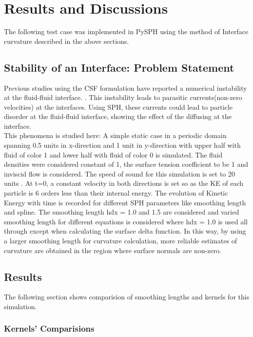 \chapter{Results and Discussions}
The following test case was implemented in PySPH using the method of Interface curvature described in the above sections. \\


\section{Stability of an Interface: Problem Statement}

Previous studies using the CSF formulation have reported a numerical instability at the fluid-fluid interface. \citep{rudman, Surface}. This instability leads to parasitic currents(non-zero velocities) at the interfaces. Using SPH, these currents could lead to particle disorder at the fluid-fluid interface, showing the effect of the diffusing at the interface. \\

This phenomena is studied here: A simple static case in a periodic domain spanning 0.5 units in x-direction and 1 unit in y-direction with upper half with fluid of color 1 and lower half with fluid of color 0 is simulated. The fluid densities were considered constant of 1, the surface tension coefficient to be 1 and inviscid flow is considered. The speed of sound for this simulation is set to 20 units \citep{Morris}. At t=0, a constant velocity in both directions is set so as the KE of each particle is 6 orders less than their internal energy.  The evolution of Kinetic Energy with time is recorded for different SPH parameters like smoothing length and spline. The smoothing length hdx = 1.0 and 1.5 are considered and varied smoothing length for different equations is considered where hdx = 1.0 is used all through except when calculating the surface delta function. In this way, by using a larger smoothing length for curvature calculation, more reliable estimates of curvature are obtained in the region where surface normals are non-zero.

\section{Results}

The following section shows comparision of smoothing lengths and kernels for this simulation. 

\subsection{Kernels' Comparisions}

